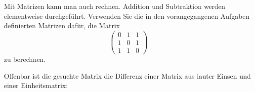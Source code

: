Mit Matrizen kann man auch rechnen. Addition und Subtraktion werden
elementweise durchgeführt. Verwenden Sie die in den vorangegangenen
Aufgaben definierten Matrizen dafür, die Matrix
\[
\begin{pmatrix}
0&1&1\\
1&0&1\\
1&1&0
\end{pmatrix}
\]
zu berechnen.

\begin{loesung}
Offenbar ist die gesuchte Matrix die Differenz einer Matrix aus lauter
Einsen und einer Einheitsmatrix:
\end{loesung}

